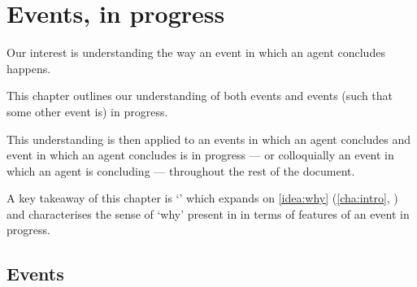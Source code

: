 \chapter{Events, in progress}
\label{cha:events-progress}


\begin{note}
  Our interest is understanding the way an event in which an agent concludes happens.

  This chapter outlines our understanding of both events and events (such that some other event is) in progress.
  
  This understanding is then applied to an events in which an agent concludes and event in which an agent concludes is in progress --- or colloquially an event in which an agent is concluding --- throughout the rest of the document.

  A key takeaway of this chapter is `\progEx{}' which expands on \autoref{idea:why} (\autoref{cha:intro}, ) and characterises the sense of `why' present in \qWhy{} in terms of features of an event in progress.
\end{note}


\section{Events}
\label{sec:events}

